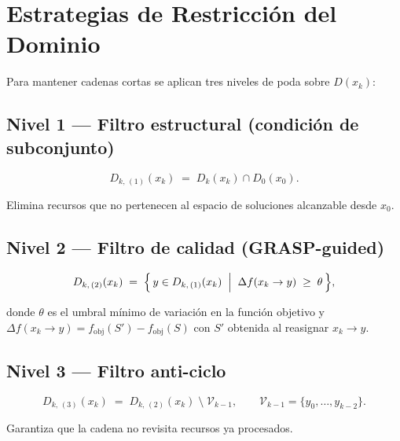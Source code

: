 \documentclass[12pt, a4paper]{article}
\theoremstyle{definition}
\theoremstyle{plain}
\theoremstyle{remark}
\newcommand{\dom}[1]{D\!\left(#1\right)}
\newcommand{\domk}[2]{D_{#1}\!\left(#2\right)}
\begin{document}
\section{Estrategias de Restricción del Dominio}

Para mantener cadenas cortas se aplican tres niveles de poda sobre $\dom{x_k}$:

\subsection{Nivel 1 — Filtro estructural (condición de subconjunto)}

\begin{equation}
  \domk{k,\,(1)}{x_k}
  \;=\;
  \domk{k}{x_k} \cap \domk{0}{x_0}.
  \label{eq:filt1}
\end{equation}

Elimina recursos que no pertenecen al espacio de soluciones
alcanzable desde $x_0$.

\subsection{Nivel 2 — Filtro de calidad (GRASP-guided)}

\begin{equation}
  \domk{k,\,(2)}{x_k}
  \;=\;
  \Bigl\{\, y \in \domk{k,\,(1)}{x_k}
  \;\Bigm|\;
  \Delta f(x_k \to y) \;\geq\; \theta \,\Bigr\},
  \label{eq:filt2}
\end{equation}

donde $\theta$ es el umbral mínimo de variación en la función objetivo y
$\Delta f(x_k \to y) = f_{\text{obj}}(S') - f_{\text{obj}}(S)$ con $S'$
obtenida al reasignar $x_k \to y$.

\subsection{Nivel 3 — Filtro anti-ciclo}

\begin{equation}
  \domk{k,\,(3)}{x_k}
  \;=\;
  \domk{k,\,(2)}{x_k} \;\setminus\; \mathcal{V}_{k-1},
  \qquad
  \mathcal{V}_{k-1} = \{y_0, \ldots, y_{k-2}\}.
  \label{eq:filt3}
\end{equation}

Garantiza que la cadena no revisita recursos ya procesados.
\end{document}
